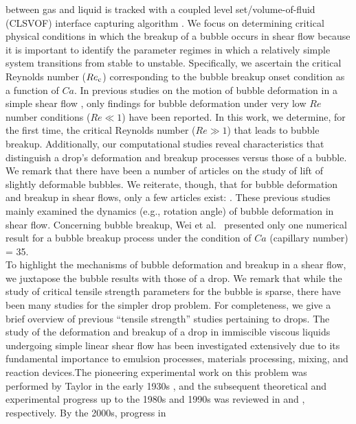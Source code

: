 \documentclass{elsarticle}
\begin{document}
{between gas and liquid is tracked with a coupled level set/volume-of-fluid (CLSVOF) interface capturing algorithm \cite{SusPuc00,SusSmiHusOhtZhi07}.  
We focus on determining critical physical conditions in which the breakup of a bubble occurs in shear flow because it is important to identify 
the parameter regimes in which a relatively simple system transitions from stable to unstable.  Specifically, we ascertain the critical 
Reynolds number ($Re_{\rm c}$) corresponding to the bubble breakup onset condition as a function of $Ca$.          
%
In previous studies on the motion of bubble deformation in a simple shear flow \cite{RusMan02, MulTobDreFisWin08}, only findings 
for bubble deformation under very low $Re$ number conditions ($Re \ll 1$) have been reported.  In this work, we determine, for the 
first time, the critical Reynolds number ($Re \gg 1$) that leads to bubble breakup.  Additionally, our computational studies 
reveal characteristics that distinguish a drop's deformation and breakup processes versus those of a bubble.
%
We remark that there have been a number of articles on the study of lift of slightly deformable bubbles\cite{ErvinANDTryggvason1997,legendre1998lift}.  
We reiterate, though, that for bubble deformation and breakup in shear flows, only a few articles exist: \cite{WeiQiaXu12,WanShiZha15}.
These previous studies mainly examined the dynamics (e.g., rotation angle) of bubble deformation in shear flow.
Concerning bubble breakup, Wei et al.~\cite{WeiQiaXu12} presented only one numerical result for a bubble breakup process under 
the condition of $Ca$ (capillary number) = 35. \\ \indent
%
To highlight the mechanisms of bubble deformation and breakup in a shear flow, we juxtapose the bubble results with those of a drop.
We remark that while the study of critical tensile strength parameters for the bubble is sparse, there have been many studies for the 
simpler drop problem. For completeness, we give a brief overview of previous ``tensile strength'' studies pertaining to drops.
%
The study of the deformation and breakup of a drop in immiscible viscous liquids undergoing simple linear shear flow has been investigated 
extensively due to its fundamental importance to emulsion processes, materials processing, mixing, and reaction devices.The pioneering 
experimental work on this problem was performed by Taylor in the early 1930s \cite{Tay32, Tay34}, and the subsequent theoretical and 
experimental progress up to the 1980s and 1990s was reviewed in \cite{Ral84} and \cite{Sto94}, respectively.  By the 2000s, progress in 
}
\end{document}
